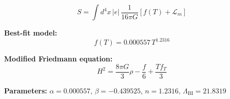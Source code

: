 
\begin{equation}
  S = \int d^4x \, |e| \, \frac{1}{16\pi G} \left[ f(T) + \mathcal{L}_m \right]
\end{equation}

\textbf{Best-fit model:}
\begin{equation}
  f(T) = 0.000557 \, T^{1.2316}
\end{equation}

\textbf{Modified Friedmann equation:}
\begin{equation}
  H^2 = \frac{8\pi G}{3} \rho - \frac{f}{6} + \frac{T f_T}{3}
\end{equation}

\textbf{Parameters:}
$\alpha = 0.000557$, \quad
$\beta = -0.439525$, \quad
$n = 1.2316$, \quad
$\Lambda_{\text{BI}} = 21.8319$